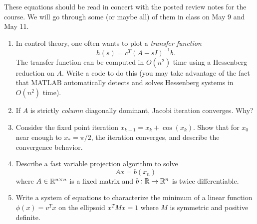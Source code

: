 \documentclass[12pt, leqno]{article}
\begin{document}

These equations should be read in concert with the posted review notes
for the course.  We will go through some (or maybe all) of them in
class on May 9 and May 11.

\begin{enumerate}
\item
  In control theory, one often wants to plot a {\em transfer function}
  \[
    h(s) = c^T (A-sI)^{-1} b.
  \]
  The transfer function can be computed in $O(n^2)$ time using a
  Hessenberg reduction on $A$.  Write a code to do this (you may take
  advantage of the fact that MATLAB automatically detects and solves
  Hessenberg systems in $O(n^2)$ time).
\item
  If $A$ is strictly {\em column} diagonally dominant, Jacobi
  iteration converges.  Why?
\item
  Consider the fixed point iteration $x_{k+1} = x_{k} + \cos(x_k)$.
  Show that for $x_0$ near enough to $x_* = \pi/2$, the iteration
  converges, and describe the convergence behavior.
\item
  Describe a fast variable projection algorithm to solve
  \[
    Ax = b(x_n)
  \]
  where $A \in \mathbb{R}^{n \times n}$ is a fixed matrix and
  $b : \mathbb{R} \rightarrow \mathbb{R}^n$ is twice differentiable.

\item
  Write a system of equations to characterize the minimum of
  a linear function $\phi(x) = v^T x$ on the ellipsoid $x^T M x = 1$
  where $M$ is symmetric and positive definite.
\end{enumerate}
\end{document}
